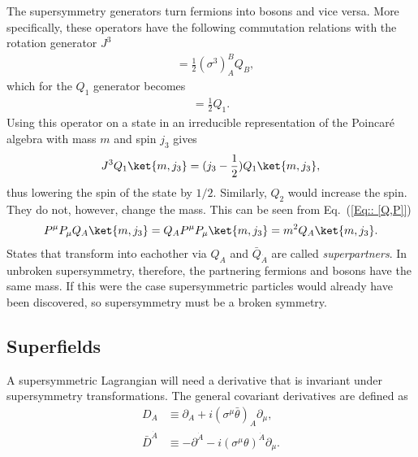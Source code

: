 \documentclass[twoside,english]{uiofysmaster}
\begin{document}
The supersymmetry generators turn fermions into bosons and vice versa. More specifically, these operators have the following commutation relations with the rotation generator $J^3$
\begin{align}
[ Q_A, J^3] &= \frac{1}{2} (\sigma^3)_A^BQ_B, 
\end{align}
which for the $Q_1$ generator becomes
\begin{align}
[Q_1, J^3] = \frac{1}{2} Q_1.
\end{align}
Using this operator on a state in an irreducible representation of the Poincar\'{e} algebra with mass $m$ and spin $j_3$ gives
\begin{align}
J^3 Q_1 \ket{m, j_3} = (j_3 - \frac{1}{2}) Q_1 \ket{m, j_3},
\end{align}
thus lowering the spin of the state by $1/2$. Similarly, $Q_2$ would increase the spin. They do not, however, change the mass. This can be seen from Eq.\ (\ref{Eq:: [Q,P]})
\begin{align}
P^{\mu} P_{\mu} Q_A \ket{m, j_3} = Q_A P^{\mu} P_{\mu} \ket{m, j_3} = m^2 Q_A \ket{m, j_3}.
\end{align}
States that transform into eachother via $Q_A$ and $\bar{Q}_{\dot{A}}$ are called \textit{superpartners}. In unbroken supersymmetry, therefore, the partnering fermions and bosons have the same mass. If this were the case supersymmetric particles would already have been discovered, so supersymmetry must be a broken symmetry.
\subsection{Superfields}

A supersymmetric Lagrangian will need a derivative that is invariant under supersymmetry transformations. The general covariant derivatives are defined as
\begin{align}
D_A & \equiv \partial_A + i (\sigma^{\mu} \bar{\theta})_A \partial_{\mu},\\
\bar{D}^{\dot{A}} & \equiv -\partial^{\dot{A}} - i (\sigma^{\mu} \theta)^{\dot{A}} \partial_{\mu}.
\end{align}
\end{document}
